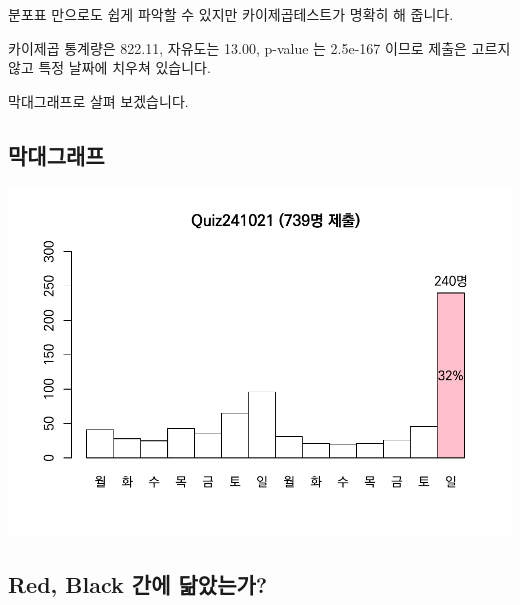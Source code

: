 \documentclass[
]{book}
\begin{document}
분포표 만으로도 쉽게 파악할 수 있지만 카이제곱테스트가 명확히 해 줍니다.

카이제곱 통계량은 822.11, 자유도는 13.00, p-value 는 2.5e-167 이므로 제출은 고르지 않고 특정 날짜에 치우쳐 있습니다.

막대그래프로 살펴 보겠습니다.

\subsection{막대그래프}\label{uxb9c9uxb300uxadf8uxb798uxd504-8}

\includegraphics{Quiz_report_2025_files/figure-latex/unnamed-chunk-227-1.pdf}

\subsection{Red, Black 간에 닮았는가?}\label{red-black-uxac04uxc5d0-uxb2eeuxc558uxb294uxac00-7}
\end{document}
